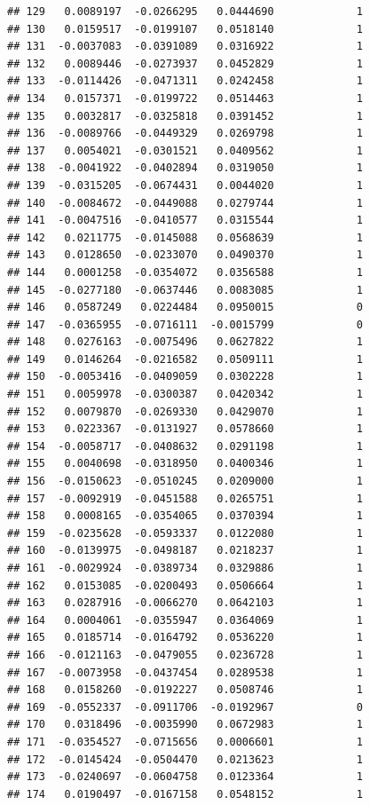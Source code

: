 \documentclass[12pt]{article}\usepackage[]{graphicx}\usepackage[]{xcolor}
\makeatletter
\newenvironment{kframe}{%
 \def\at@end@of@kframe{}%
 \ifinner\ifhmode%
  \def\at@end@of@kframe{\end{minipage}}%
  \begin{minipage}{\columnwidth}%
 \fi\fi%
 \def\FrameCommand##1{\hskip\@totalleftmargin \hskip-\fboxsep
 \colorbox{shadecolor}{##1}\hskip-\fboxsep
     \hskip-\linewidth \hskip-\@totalleftmargin \hskip\columnwidth}%
 \MakeFramed {\advance\hsize-\width
   \@totalleftmargin\z@ \linewidth\hsize
   \@setminipage}}%
 {\par\unskip\endMakeFramed%
 \at@end@of@kframe}
\newenvironment{knitrout}{}{} %
\makeatother
\begin{document}
\begin{knitrout}
\begin{kframe}
\begin{verbatim}
## 129   0.0089197  -0.0266295   0.0444690             1
## 130   0.0159517  -0.0199107   0.0518140             1
## 131  -0.0037083  -0.0391089   0.0316922             1
## 132   0.0089446  -0.0273937   0.0452829             1
## 133  -0.0114426  -0.0471311   0.0242458             1
## 134   0.0157371  -0.0199722   0.0514463             1
## 135   0.0032817  -0.0325818   0.0391452             1
## 136  -0.0089766  -0.0449329   0.0269798             1
## 137   0.0054021  -0.0301521   0.0409562             1
## 138  -0.0041922  -0.0402894   0.0319050             1
## 139  -0.0315205  -0.0674431   0.0044020             1
## 140  -0.0084672  -0.0449088   0.0279744             1
## 141  -0.0047516  -0.0410577   0.0315544             1
## 142   0.0211775  -0.0145088   0.0568639             1
## 143   0.0128650  -0.0233070   0.0490370             1
## 144   0.0001258  -0.0354072   0.0356588             1
## 145  -0.0277180  -0.0637446   0.0083085             1
## 146   0.0587249   0.0224484   0.0950015             0
## 147  -0.0365955  -0.0716111  -0.0015799             0
## 148   0.0276163  -0.0075496   0.0627822             1
## 149   0.0146264  -0.0216582   0.0509111             1
## 150  -0.0053416  -0.0409059   0.0302228             1
## 151   0.0059978  -0.0300387   0.0420342             1
## 152   0.0079870  -0.0269330   0.0429070             1
## 153   0.0223367  -0.0131927   0.0578660             1
## 154  -0.0058717  -0.0408632   0.0291198             1
## 155   0.0040698  -0.0318950   0.0400346             1
## 156  -0.0150623  -0.0510245   0.0209000             1
## 157  -0.0092919  -0.0451588   0.0265751             1
## 158   0.0008165  -0.0354065   0.0370394             1
## 159  -0.0235628  -0.0593337   0.0122080             1
## 160  -0.0139975  -0.0498187   0.0218237             1
## 161  -0.0029924  -0.0389734   0.0329886             1
## 162   0.0153085  -0.0200493   0.0506664             1
## 163   0.0287916  -0.0066270   0.0642103             1
## 164   0.0004061  -0.0355947   0.0364069             1
## 165   0.0185714  -0.0164792   0.0536220             1
## 166  -0.0121163  -0.0479055   0.0236728             1
## 167  -0.0073958  -0.0437454   0.0289538             1
## 168   0.0158260  -0.0192227   0.0508746             1
## 169  -0.0552337  -0.0911706  -0.0192967             0
## 170   0.0318496  -0.0035990   0.0672983             1
## 171  -0.0354527  -0.0715656   0.0006601             1
## 172  -0.0145424  -0.0504470   0.0213623             1
## 173  -0.0240697  -0.0604758   0.0123364             1
## 174   0.0190497  -0.0167158   0.0548152             1

\end{verbatim}
\end{kframe}
\end{knitrout}
\end{document}
